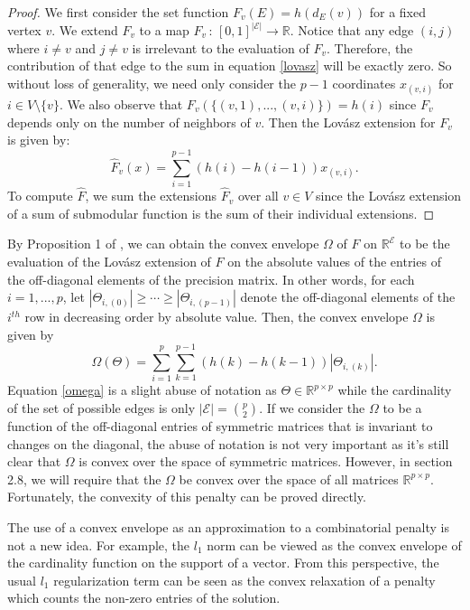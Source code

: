 \documentclass{uwstat572}
\theoremstyle{remark}
\theoremstyle{definition}
\begin{document}
\begin{proof}
We first consider the set function $F_v(E) = h(d_E(v))$ for a fixed vertex $v$. We extend $F_v$ to a map  $\hat{F}_v \, : \, [0,1]^{|\mathcal{E}|} \to \mathbb{R}$.  Notice that any edge $(i,j)$ where $i \neq v$ and $j \neq v$ is irrelevant to the evaluation of $F_v$. Therefore, the contribution of that edge to the sum in equation \eqref{lovasz} will be exactly zero. So without loss of generality, we need only consider the $p-1$ coordinates $x_{(v,i)}$ for $i \in V \setminus \{v\}$.  We also observe that $F_v( \{(v,1),...,(v,i)\}) = h(i)$ since $F_v$ depends only on the number of neighbors of $v$. Then the Lov{\'a}sz extension for $F_v$ is given by:
\begin{equation*}
    \hat{F}_v(x) = \sum_{i = 1}^{p-1} (h(i) - h(i-1)) x_{(v,i)}.
\end{equation*}
To compute $\hat{F}$, we sum the extensions $\hat{F}_v$ over all $v \in V$ since the Lov{\'a}sz extension of a sum of submodular function is the sum of their individual extensions.
\end{proof}


By Proposition 1 of \cite{bach2010}, we can obtain the convex envelope $\Omega$ of $F$ on $\mathbb{R}^{\mathcal{E}}$ to be the evaluation of the Lov{\'a}sz extension of $F$ on the absolute values of the entries of the off-diagonal elements of the precision matrix.  In other words, for each $i = 1,...,p$,  let $|\Theta_{i,(0)}| \geq \cdots \geq |\Theta_{i,(p-1)}|$ denote the off-diagonal elements of the $i^{th}$ row in decreasing order by absolute value.  Then, the convex envelope $\Omega$ is given by
\begin{equation}\label{omega}
\Omega(\Theta) = \sum_{i=1}^p \sum_{k=1}^{p-1} (h(k) - h(k-1)) | \Theta_{i,(k)}|.
\end{equation}
Equation \eqref{omega} is a slight abuse of notation as $\Theta \in \mathbb{R}^{p \times p}$ while the cardinality of the set of possible edges is only $|\mathcal{E}| = \binom{p}{2}$.  If we consider the $\Omega$ to be a function of the off-diagonal entries of symmetric matrices that is invariant to changes on the diagonal, the abuse of notation is not very important as it's still clear that $\Omega$ is convex over the space of symmetric matrices.  However, in section 2.8, we will require that the $\Omega$ be convex over the space of all matrices $\mathbb{R}^{p \times p}$. Fortunately, the convexity of this penalty can be proved directly.  

The use of a convex envelope as an approximation to a combinatorial penalty is not a new idea.  For example, the $l_1$ norm can be viewed as the convex envelope of the cardinality function on the support of a vector.  From this perspective, the usual $l_1$ regularization term can be seen as the convex relaxation of a penalty which counts the non-zero entries of the solution.
\end{document}
